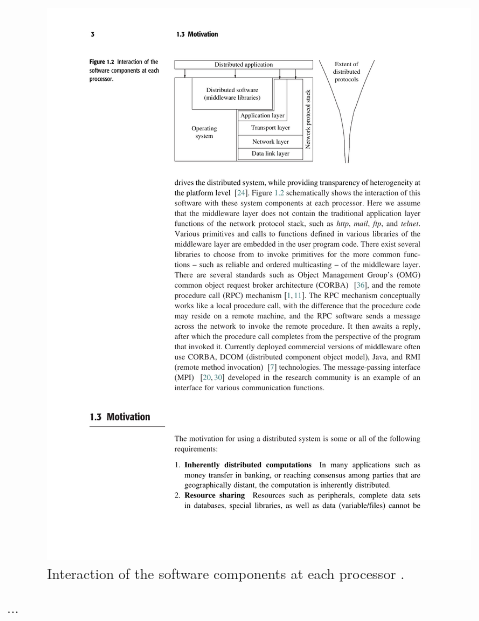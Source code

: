 \documentclass[../report.tex]{subfiles}
\begin{document}
\begin{figure}[h!]
\centering
\includegraphics[width=0.8\linewidth]{figures/processinteraction.pdf}
\caption{Interaction of the software components at each processor \cite[3]{kshemkalyani2011distributed}.}
\label{fig:processinteraction}
\end{figure}

...


\end{document}
